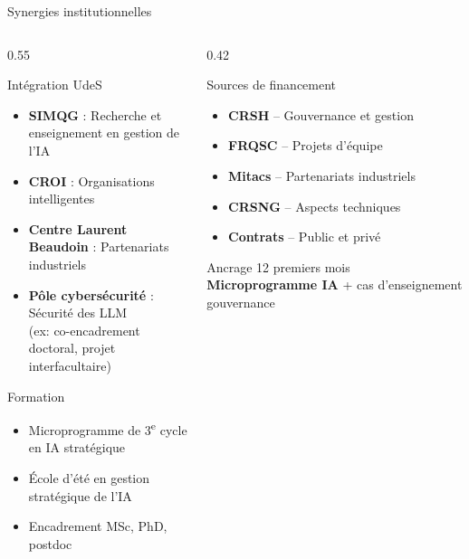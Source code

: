 \documentclass[aspectratio=169,11pt]{beamer}
\begin{document}
\begin{frame}{Synergies institutionnelles}
  \begin{columns}[T]
    \begin{column}{0.55\textwidth}
      \begin{block}{Intégration UdeS}
        \begin{itemize}\small
          \item \textbf{SIMQG} : Recherche et enseignement en gestion de l'IA
          \item \textbf{CROI} : Organisations intelligentes
          \item \textbf{Centre Laurent Beaudoin} : Partenariats industriels
          \item \textbf{Pôle cybersécurité} : Sécurité des LLM\\{\scriptsize (ex: co-encadrement doctoral, projet interfacultaire)}
        \end{itemize}
      \end{block}
      
      \begin{block}{Formation}
        \begin{itemize}\small
          \item Microprogramme de 3\textsuperscript{e} cycle en IA stratégique
          \item École d'été en gestion stratégique de l'IA
          \item Encadrement MSc, PhD, postdoc
        \end{itemize}
      \end{block}
    \end{column}
    \begin{column}{0.42\textwidth}
      \begin{exampleblock}{Sources de financement}
        \begin{itemize}\small
          \item \textbf{CRSH} -- Gouvernance et gestion
          \item \textbf{FRQSC} -- Projets d'équipe
          \item \textbf{Mitacs} -- Partenariats industriels
          \item \textbf{CRSNG} -- Aspects techniques
          \item \textbf{Contrats} -- Public et privé
        \end{itemize}
      \end{exampleblock}
      
      \vspace{0.3em}
      
      \begin{block}{Ancrage 12 premiers mois}
        \footnotesize\textbf{Microprogramme IA} + cas d'enseignement gouvernance
      \end{block}
    \end{column}
  \end{columns}
\end{frame}
\end{document}
